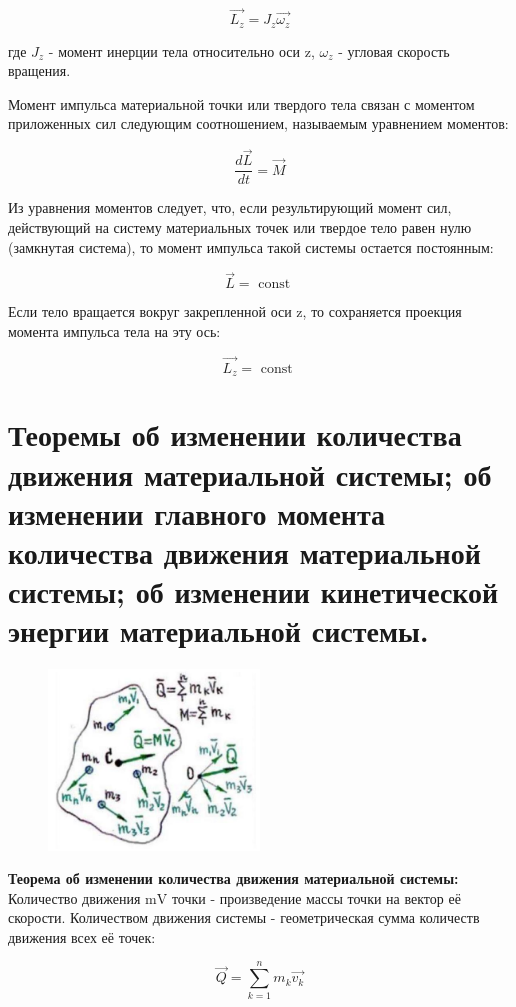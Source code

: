 $$
\overrightarrow{L_{z}}=J_{z} \overrightarrow{\omega_{z}}
$$

где $J_{z}$ - момент инерции тела относительно оси z, $\omega_{z}$ - угловая скорость вращения.

Момент импульса материальной точки или твердого тела связан с моментом приложенных сил следующим соотношением, называемым уравнением моментов:

$$
\frac{d \vec{L}}{d t}=\vec{M}
$$

Из уравнения моментов следует, что, если результирующий момент сил, действующий на систему материальных точек или твердое тело равен нулю (замкнутая система), то момент импульса такой системы остается постоянным:

$$
\vec{L}=\text { const }
$$

Если тело вращается вокруг закрепленной оси z, то сохраняется проекция момента импульса тела на эту ось:

$$
\overrightarrow{L_{z}}=\text { const }
$$

 \section{Теоремы об изменении количества движения материальной системы; об изменении главного момента количества движения материальной системы; об изменении кинетической энергии материальной системы.}


\begin{figure}[h!]
    \centering
    \includegraphics[width=0.5\textwidth]{2023_05_21_6e9b4e8657e82b213c6ag-05}
\end{figure}


\textbf{Теорема об изменении количества движения материальной системы:} Количество движения $\mathrm{mV}$ точки - произведение массы точки на вектор её скорости. Количеством движения системы - геометрическая сумма количеств движения всех её точек:

$$
\vec{Q}=\sum_{k=1}^{n} m_{k} \overrightarrow{v_{k}}
$$

